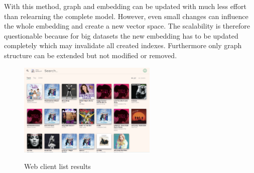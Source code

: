 \documentclass[sigconf]{acmart}
\begin{document}
With this method, graph and embedding can be updated with much less effort than relearning the complete model. However, even small changes can influence the whole embedding and create a new vector space. The scalability is therefore questionable because for big datasets the new embedding has to be updated completely which may invalidate all created indexes. Furthermore only graph structure can be extended but not modified or removed.



\begin{figure}[ht]
	{\includegraphics[width=250px]{web_client.png}}	
	\caption{Web client list results}
	\label{fig:web_client}
\end{figure}
\end{document}
